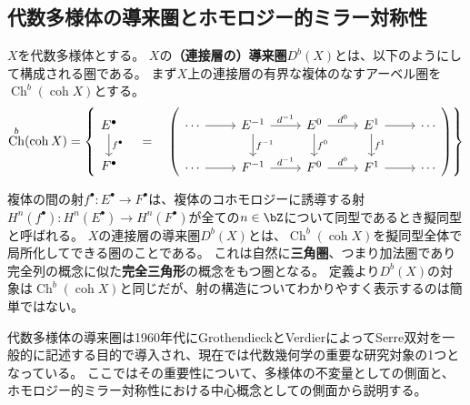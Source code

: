 \documentclass[uplatex,11pt,a4paper,dvipdfmx]{jsarticle}
\numberwithin{equation}{section}
\theoremstyle{definition}
\DeclareMathOperator{\Ch}{\mathrm{Ch}}
\DeclareMathOperator{\coh}{\mathrm{coh}}
\begin{document}
\subsection{代数多様体の導来圏とホモロジー的ミラー対称性}
$X$を代数多様体とする。
$X$の\textbf{（連接層の）導来圏}$D^b(X)$とは、以下のようにして構成される圏である。
まず$X$上の連接層の有界な複体のなすアーベル圏を$\Ch^b(\coh X)$とする。
\begin{equation}
    \Ch^b(\coh X) = \left\{
      \begin{tikzcd}
          E^\bullet \arrow[d, "f^\bullet", name=F]\\
          F^\bullet
      \end{tikzcd}
      \quad = \quad
      \left(
      \begin{tikzcd}
              \cdots \arrow[r] &E^{-1} \arrow[r, "d^{-1}"]\arrow[d, "f^{-1}"] &E^0 \arrow[r, "d^{0}"]\arrow[d, "f^{0}"] &E^1 \arrow[d, "f^{1}"] \arrow[r] &\cdots\\
              \cdots \arrow[r] &F^{-1} \arrow[r, "d^{-1}"] &F^0 \arrow[r, "d^{0}"] &F^1\arrow[r] &\cdots
          \end{tikzcd}
      \right)
    \right\}
\end{equation}


複体の間の射$f^\bullet \colon E^\bullet \to F^\bullet$は、複体のコホモロジーに誘導する射$H^n(f^\bullet) \colon H^n(E^\bullet) \to H^n(F^\bullet)$が全ての$n \in \bZ$について同型であるとき擬同型と呼ばれる。
$X$の連接層の導来圏$D^b(X)$とは、$\Ch^b(\coh X)$を擬同型全体で局所化してできる圏のことである。
これは自然に\textbf{三角圏}、つまり加法圏であり完全列の概念に似た\textbf{完全三角形}の概念をもつ圏となる。
定義より$D^b(X)$の対象は$\Ch^b(\coh X)$と同じだが、射の構造についてわかりやすく表示するのは簡単ではない。

代数多様体の導来圏は1960年代にGrothendieckとVerdierによってSerre双対を一般的に記述する目的で導入され、現在では代数幾何学の重要な研究対象の1つとなっている。
ここではその重要性について、多様体の不変量としての側面と、ホモロジー的ミラー対称性における中心概念としての側面から説明する。
\end{document}
